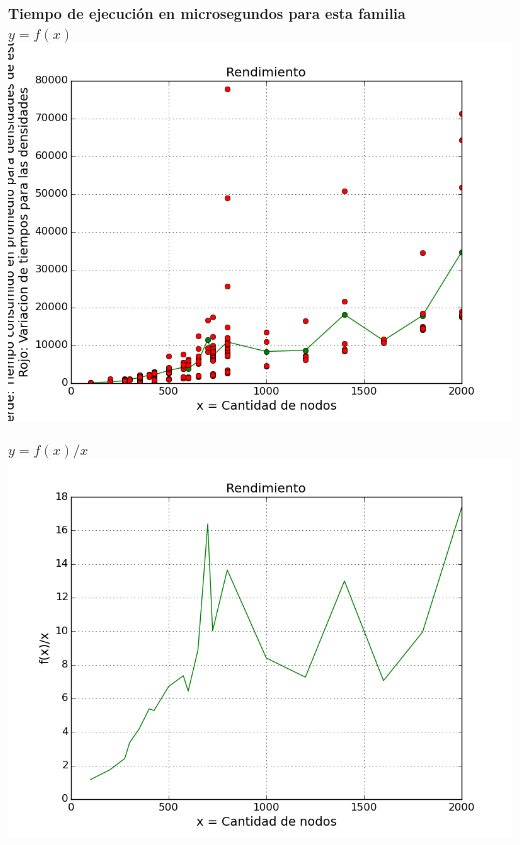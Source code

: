 \begin{center}
	\textbf{Tiempo de ejecuci\'on en microsegundos para esta familia}\\
	\textbf{$y = f(x)$}\\
	\includegraphics[scale=0.7]{experimentos/bqlocal/rendimiento_aristas_cuadraticas_3/complexity_variation.png}
\end{center}

\begin{center}
	\textbf{$y = f(x)/x$}\\
	\includegraphics[scale=0.7]{experimentos/bqlocal/rendimiento_aristas_cuadraticas_3/complexity_med_over_n.png}
\end{center}

